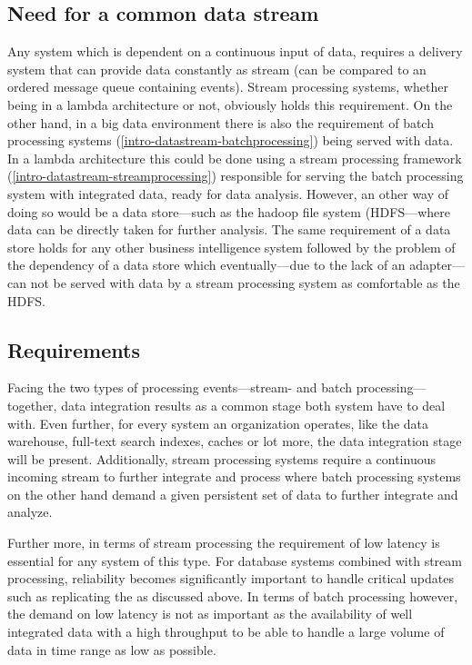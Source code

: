 \subsection{Need for a common data stream}
Any system which is dependent on a continuous input of data, requires a delivery
system that can provide data constantly as stream (can be
compared to an ordered message queue  containing events). Stream
processing systems, whether being in a lambda architecture or not, obviously
holds this requirement. On the other hand, in a big data environment there is
also the requirement of batch processing systems
(\ref{intro-datastream-batchprocessing}) being served with data. In a lambda
architecture this could be done using a stream processing framework
(\ref{intro-datastream-streamprocessing}) responsible for serving the batch
processing system with integrated data, ready for data analysis. However, an
other way of doing so would be a data store---such as the hadoop file system
(HDFS---where data can be directly taken for further analysis.
The same requirement of a data store holds for any
other business intelligence system followed by the problem of the dependency of
a data store which eventually---due to the lack of an adapter---can not be
served with data by a stream processing system as comfortable as the HDFS.

\subsection{Requirements}
Facing the two types of processing events---stream- and batch
processing---together, data integration results as a common stage both system have to
deal with. Even further, for every system an organization operates, like the
data warehouse, full-text search indexes, caches or lot more, the data
integration stage will be present. 
Additionally, stream processing systems require a continuous
incoming stream to further integrate and process where batch processing systems
on the other hand demand a given persistent set of data to further integrate and analyze.

Further more, in terms of stream processing the requirement of low latency is
essential for any system of this type. For database systems combined with stream
processing, reliability becomes significantly important to handle critical updates 
such as replicating the as discussed above.
In terms of batch processing however, the demand on low latency is not as
important as the availability of well integrated data with a high throughput to
be able to handle a large volume of data in time range as low as possible.

